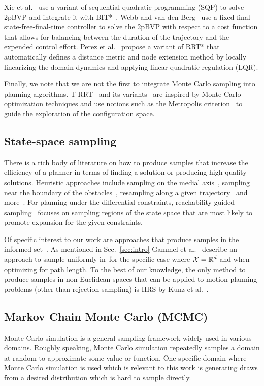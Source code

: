 \documentclass[letterpaper, 10 pt, conference]{ieeeconf}  %
\begin{document}
Xie et al.~\cite{XBPA15} use a variant of sequential quadratic programming (SQP) to solve 2pBVP and integrate it with BIT*~\cite{GSB15}.
Webb and van den Berg~\cite{WB13} use a fixed-final-state-free-final-time controller to solve the 2pBVP  with respect to a cost function that allows for balancing between the duration of the trajectory and the expended control effort.
Perez et al.~\cite{PPKKL12} propose a variant of RRT* that automatically defines a distance metric and node extension method by locally linearizing
the domain dynamics and applying linear quadratic regulation (LQR).

Finally, we note that we are not the first to integrate Monte Carlo sampling into planning algorithms. 
T-RRT~\cite{JCS10} and its variants~\cite{DSC13} are inspired by Monte Carlo optimization techniques and use notions such as the Metropolis criterion~\cite{CG95} to guide the exploration of the configuration space.


\subsection{State-space sampling}
\label{subsec:sampling}
There is a rich body of literature on how to produce samples that increase the efficiency of a planner in terms of finding a solution or producing high-quality solutions.
Heuristic approaches include
sampling on the medial axis~\cite{WAS99a, YDLTA14},
sampling near the boundary of the obstacles~\cite{YTEA12},
resampling along a given trajectory~\cite{AS11}
and more~\cite{US03, SWT09}.
For planning under the differential constraints,
reachability-guided sampling~\cite{PLAEFRA17} focuses on sampling regions of the state space that are most likely to promote expansion for the given constraints.

Of specific interest to our work are approaches that produce samples in the informed set~\Cinf.
As mentioned in Sec.~\ref{sec:intro} Gammel et al.~\cite{GSB14} describe an approach to sample uniformly in~\Cinf for the specific case where $\mathcal{X} = \mathbb{R}^d$ and when optimizing for path length.
To the best of our knowledge, the only method to produce samples in non-Euclidean spaces that can be  applied to motion planning problems (other than rejection sampling) is HRS by Kunz et al.~\cite{KTC16}.

\subsection{Markov Chain Monte Carlo (MCMC)}
\label{subsec:mcmc}
Monte Carlo simulation is a general sampling framework widely used in various domains. %
Roughly speaking, Monte Carlo simulation repeatedly samples a domain at random to approximate some value or function.
One specific domain where Monte Carlo simulation is used which is relevant to this work is generating draws from a desired distribution which is hard to sample directly.
\end{document}
